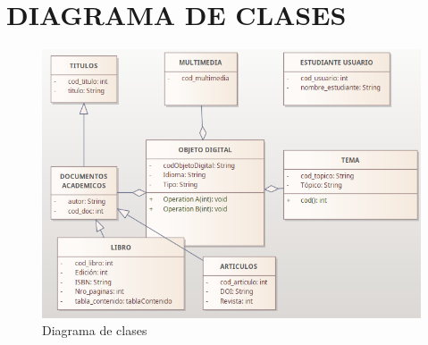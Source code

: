 \chapter*{DIAGRAMA DE CLASES}
\begin{figure}[h]
	\centering
	\includegraphics[scale=0.8]{images/clase2}
	\caption{Diagrama de clases }
\end{figure}
